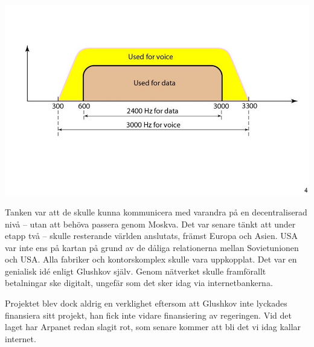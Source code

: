 \documentclass[a4paper,11pt]{article}
\begin{document}
{\centering
\includegraphics[width=1\linewidth]{Bilder/bandbredd.jpg}
} \newpage

Tanken var att de skulle kunna kommunicera med varandra på en decentraliserad nivå -- utan att behöva passera genom Moskva. Det var senare tänkt att under etapp två -- skulle resterande världen anslutats, främst Europa och Asien. USA var inte ens på kartan på grund av de dåliga relationerna mellan Sovietunionen och USA. Alla fabriker och kontorskomplex skulle vara uppkopplat. Det var en genialisk idé enligt Glushkov själv. Genom nätverket skulle framförallt betalningar ske digitalt, ungefär som det sker idag via internetbankerna.

Projektet blev dock aldrig en verklighet eftersom att Glushkov inte lyckades finansiera sitt projekt, han fick inte vidare finansiering av regeringen. Vid det laget har Arpanet redan slagit rot, som senare kommer att bli det vi idag kallar internet. 
\end{document}
